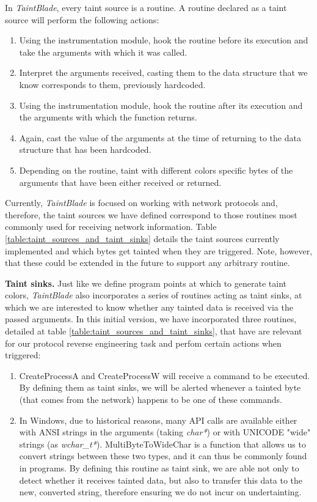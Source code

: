 \documentclass[conference]{IEEEtran}
\begin{document}
In \textit{TaintBlade}, every taint source is a routine. A routine declared as
a taint source will perform the following actions:
\begin{enumerate}
    \item Using the instrumentation module, hook the routine before its execution and
          take the arguments with which it was called.
    \item Interpret the arguments received, casting them to the data structure that we
          know corresponds to them, previously hardcoded.
    \item Using the instrumentation module, hook the routine after its execution and the
          arguments with which the function returns.
    \item Again, cast the value of the arguments at the time of returning to the data
          structure that has been hardcoded.
    \item Depending on the routine, taint with different colors specific bytes of the
          arguments that have been either received or returned.
\end{enumerate}

Currently, \textit{TaintBlade} is focused on working with network protocols
and, therefore, the taint sources we have defined correspond to those routines
most commonly used for receiving network information. Table
\ref{table:taint_sources_and_taint_sinks} details the taint sources currently
implemented and which bytes get tainted when they are triggered. Note, however,
that these could be extended in the future to support any arbitrary routine.

\textbf{Taint sinks.} Just like we define program points at which to generate taint colors,
\textit{TaintBlade} also incorporates a series of routines acting as taint sinks,
at which we are interested to know whether any tainted data is received via the passed
arguments. In this initial version, we have incorporated three routines, detailed at 
table \ref{table:taint_sources_and_taint_sinks}, that have are relevant for our protocol 
reverse engineering task and perfom certain actions when triggered:
\begin{enumerate}
    \item CreateProcessA and CreateProcessW will receive a command to be executed. By
          defining them as taint sinks, we will be alerted whenever a tainted byte (that
          comes from the network) happens to be one of these commands.
    \item In Windows, due to historical reasons, many API calls are available either with
          ANSI strings in the arguments (taking \textit{char*}) or with UNICODE "wide"
          strings (as \textit{wchar\_t*}). MultiByteToWideChar is a function that allows
          us to convert strings between these two types, and it can thus be commonly
          found in programs. By defining this routine as taint sink, we are able not only
          to detect whether it receives tainted data, but also to transfer this data to
          the new, converted string, therefore ensuring we do not incur on undertainting.
\end{enumerate}
\end{document}
